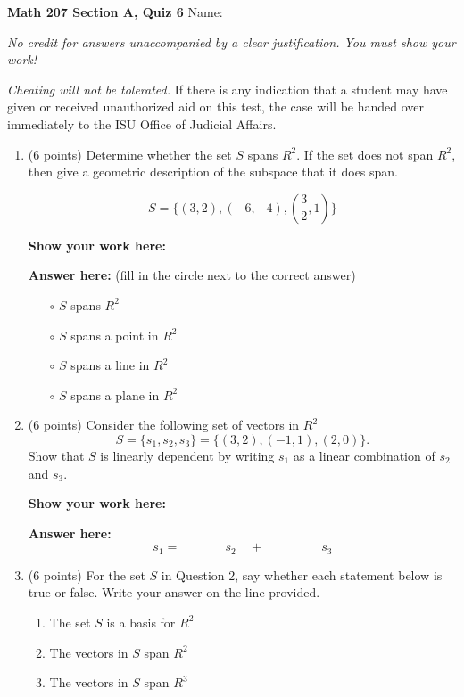 \documentclass[12pt]{article}
\begin{document}
\vskip-2cm

\textbf{Math 207 Section A, Quiz 6} \hfill
Name: \underline{\phantom{XXXXXXXXXXXXXX}}

{\it No credit for answers unaccompanied by a clear justification. You must
show your work!}

{\it Cheating will not be tolerated.}  If there is any indication that a
  student may have given or received unauthorized aid on this test, the case 
  will be handed over immediately to the ISU Office of Judicial Affairs.%

\begin{enumerate}
\item (6 points)
Determine whether the set $S$ spans $R^2$. If the set does not span $R^2$, then
give a geometric description of the subspace that it does span. 

\[S = 
\{(3, 2), (−6, −4), (\frac{3}{2}, 1)\}
\]

{\bf Show your work here:}

\vskip10cm

{\bf Answer here:}
(fill in the circle next to the correct answer)  
\begin{itemize}
\item[$\circ$] $S$ spans $R^2$
\item[$\circ$] $S$ spans a point in $R^2$
\item[$\circ$] $S$ spans a line in $R^2$
\item[$\circ$] $S$ spans a plane in $R^2$
\end{itemize}

\newpage
\item (6 points)
Consider the following set of vectors in $R^2$
\[
S = \{s_1, s_2, s_3\} = \{(3, 2), (−1, 1), (2, 0)\}.
\]
Show that $S$ is linearly dependent by writing $s_1$ as a linear combination of
$s_2$ and $s_3$.

{\bf Show your work here:}

\vskip8cm

{\bf Answer here:}
\[ s_1 = \phantom{XXXX}\; s_2 \quad + \quad
\phantom{XXXX} \; s_3
\]
\vskip1cm

\item (6 points)
For the set $S$ in Question 2, say whether each 
statement below is true or false.  Write your answer on the line provided.
\begin{enumerate}
\item The set $S$ is a basis for $R^2$ \hfill \underline{\phantom{XXXXXXXXX}}
\item The vectors in $S$ span $R^2$ \hfill \underline{\phantom{XXXXXXXXX}}
\item The vectors in $S$ span $R^3$ \hfill \underline{\phantom{XXXXXXXXX}}
\end{enumerate}

\end{enumerate}
\end{document}
